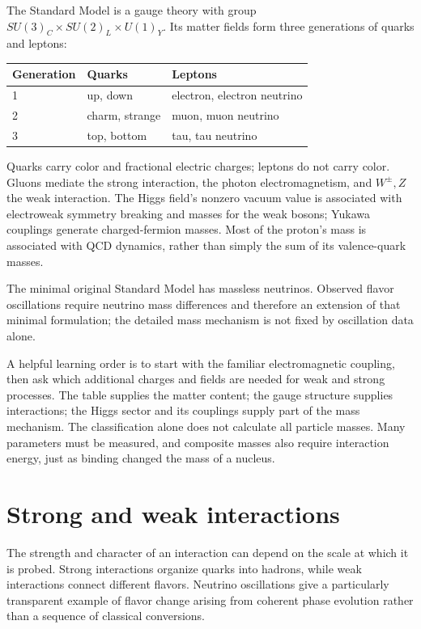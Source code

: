 \documentclass[11pt,oneside]{book}
\theoremstyle{reviewstyle}
\begin{document}
The Standard Model is a gauge theory with group $SU(3)_C\times SU(2)_L\times U(1)_Y$. Its matter fields form three generations of quarks and leptons:
\begin{center}
\begin{tabular}{lll}
\toprule
Generation & Quarks & Leptons\\
\midrule
1 & up, down & electron, electron neutrino\\
2 & charm, strange & muon, muon neutrino\\
3 & top, bottom & tau, tau neutrino\\
\bottomrule
\end{tabular}
\end{center}
Quarks carry color and fractional electric charges; leptons do not carry color. Gluons mediate the strong interaction, the photon electromagnetism, and $W^\pm,Z$ the weak interaction. The Higgs field's nonzero vacuum value is associated with electroweak symmetry breaking and masses for the weak bosons; Yukawa couplings generate charged-fermion masses. Most of the proton's mass is associated with QCD dynamics, rather than simply the sum of its valence-quark masses.

The minimal original Standard Model has massless neutrinos. Observed flavor oscillations require neutrino mass differences and therefore an extension of that minimal formulation; the detailed mass mechanism is not fixed by oscillation data alone.

A helpful learning order is to start with the familiar electromagnetic coupling, then ask which additional charges and fields are needed for weak and strong processes. The table supplies the matter content; the gauge structure supplies interactions; the Higgs sector and its couplings supply part of the mass mechanism. The classification alone does not calculate all particle masses. Many parameters must be measured, and composite masses also require interaction energy, just as binding changed the mass of a nucleus.

\section{Strong and weak interactions}
The strength and character of an interaction can depend on the scale at which it is probed. Strong interactions organize quarks into hadrons, while weak interactions connect different flavors. Neutrino oscillations give a particularly transparent example of flavor change arising from coherent phase evolution rather than a sequence of classical conversions.
\end{document}
